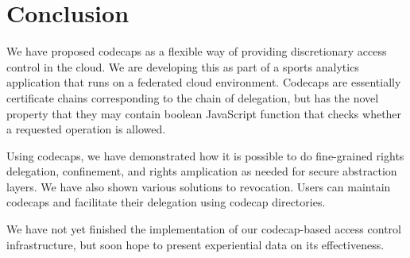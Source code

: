 \documentclass[10pt, conference, compsocconf]{IEEEtran}
\begin{document}
\section{Conclusion}

We have proposed codecaps as a flexible 
way of providing discretionary access control in the cloud.  We are developing this
as part of a sports analytics application that runs on a federated
cloud environment.  
Codecaps are essentially certificate chains corresponding to the chain of delegation,
but has the novel property that they may contain boolean JavaScript function that checks whether a requested operation is allowed.



Using codecaps, we have demonstrated how it is possible to do
fine-grained rights delegation, confinement, and rights amplication
as needed for secure abstraction layers.  We have also shown various
solutions to revocation.  Users can maintain codecaps and facilitate
their delegation using codecap directories.

We have not yet finished the implementation of our codecap-based access
control infrastructure, but soon hope to present experiential
data on its effectiveness.



\end{document}
